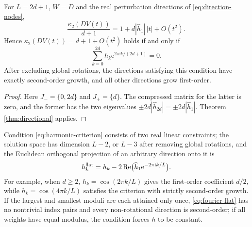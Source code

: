 \documentclass[10pt,twoside,final]{siamart1116}
\numberwithin{equation}{section}
\numberwithin{theorem}{section}
\newcommand{\cond}{\kappa_2}
\newcommand{\e}{\mathrm e}
\newcommand{\ii}{\mathrm i}
\begin{document}
\begin{corollary}
\label{cor:first-harmonic}
For $L=2d+1$, $W=D$ and the real perturbation directions of
\eqref{eq:direction-nodes},
\begin{equation}\label{eq:first-harmonic}
\frac{\cond(DV(t))}{d+1}
=1+d|\widehat h_1|\,|t|+O(t^2).
\end{equation}
Hence $\cond(DV(t))=d+1+O(t^2)$ holds if and only if
\begin{equation}\label{eq:harmonic-criterion}
\sum_{k=0}^{2d}h_k \e^{2\pi\ii k/(2d+1)}=0.
\end{equation}
After excluding global rotations, the directions satisfying this condition have exactly
second-order growth, and all other directions grow first-order.
\end{corollary}
\begin{proof}
Here $J_-=\{0,2d\}$ and $J_+=\{d\}$. The compressed matrix for the latter is zero, and
the former has the two eigenvalues $\pm2d|\widehat h_{2d}|=\pm2d|\widehat h_1|$. Theorem
\ref{thm:directional} applies.
\end{proof}

Condition \eqref{eq:harmonic-criterion} consists of two real linear constraints; the
solution space has dimension $L-2$, or $L-3$ after removing global rotations, and the
Euclidean orthogonal projection of an arbitrary direction onto it is
\begin{equation}\label{eq:harmonic-projection}
h_k^{\rm flat}=h_k-2\operatorname{Re}\bigl(\widehat h_1\e^{-2\pi\ii k/L}\bigr).
\end{equation}
For example, when $d\ge2$, $h_k=\cos(2\pi k/L)$ gives the first-order coefficient $d/2$,
while $h_k=\cos(4\pi k/L)$ satisfies the criterion with strictly second-order growth. If
the largest and smallest moduli are each attained only once, \eqref{eq:fourier-flat} has
no nontrivial index pairs and every non-rotational direction is second-order; if all
weights have equal modulus, the condition forces $h$ to be constant. 
\end{document}
